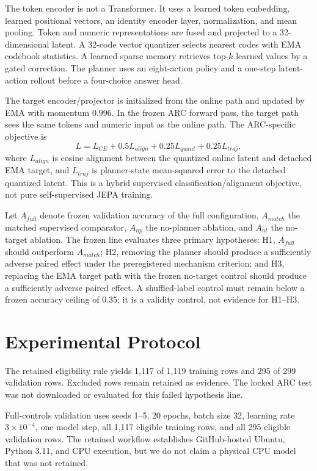 \documentclass[conference]{IEEEtran}
\begin{document}
The token encoder is not a Transformer. It uses a learned token embedding, learned positional vectors, an identity encoder layer, normalization, and mean pooling. Token and numeric representations are fused and projected to a 32-dimensional latent. A 32-code vector quantizer selects nearest codes with EMA codebook statistics. A learned sparse memory retrieves top-$k$ learned values by a gated correction. The planner uses an eight-action policy and a one-step latent-action rollout before a four-choice answer head.

The target encoder/projector is initialized from the online path and updated by EMA with momentum $0.996$. In the frozen ARC forward pass, the target path sees the same tokens and numeric input as the online path. The ARC-specific objective is
\begin{equation}
L=L_{CE}+0.5L_{align}+0.25L_{quant}+0.25L_{traj},
\end{equation}
where $L_{align}$ is cosine alignment between the quantized online latent and detached EMA target, and $L_{traj}$ is planner-state mean-squared error to the detached quantized latent. This is a hybrid supervised classification/alignment objective, not pure self-supervised JEPA training.

Let $A_{full}$ denote frozen validation accuracy of the full configuration, $A_{match}$ the matched supervised comparator, $A_{np}$ the no-planner ablation, and $A_{nt}$ the no-target ablation. The frozen line evaluates three primary hypotheses: H1, $A_{full}$ should outperform $A_{match}$; H2, removing the planner should produce a sufficiently adverse paired effect under the preregistered mechanism criterion; and H3, replacing the EMA target path with the frozen no-target control should produce a sufficiently adverse paired effect. A shuffled-label control must remain below a frozen accuracy ceiling of $0.35$; it is a validity control, not evidence for H1--H3.

\section{Experimental Protocol}
The retained eligibility rule yields 1,117 of 1,119 training rows and 295 of 299 validation rows. Excluded rows remain retained as evidence. The locked ARC test was not downloaded or evaluated for this failed hypothesis line.

Full-controls validation uses seeds 1--5, 20 epochs, batch size 32, learning rate $3\times10^{-4}$, one model step, all 1,117 eligible training rows, and all 295 eligible validation rows. The retained workflow establishes GitHub-hosted Ubuntu, Python 3.11, and CPU execution, but we do not claim a physical CPU model that was not retained.
\end{document}
